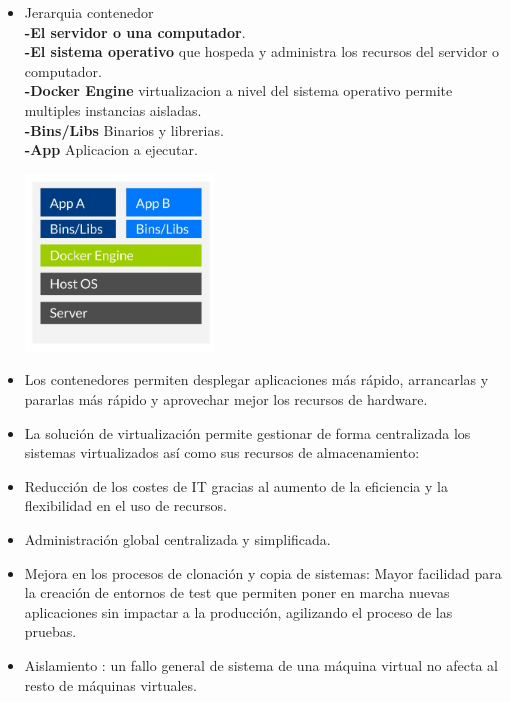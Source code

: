 \documentclass[twoside,twocolumn]{article}
\begin{document}
\begin{itemize}
	\item Jerarquia contenedor
	\\ \textbf{-El servidor o una computador}.
	\\ \textbf{-El sistema operativo} que hospeda y administra los recursos del servidor o computador.
	\\ \textbf{-Docker Engine} virtualizacion a nivel del sistema operativo permite multiples instancias aisladas.
	\\ \textbf{-Bins/Libs} Binarios y librerias.
	\\ \textbf{-App} Aplicacion a ejecutar.
	\begin{center}
	\includegraphics[width=5cm]{./Imagenes/jerarquia2} 
	\end{center}
\end{itemize} 

\begin{itemize}
	\item Los contenedores permiten desplegar aplicaciones más rápido, arrancarlas y pararlas más rápido y aprovechar mejor los recursos de hardware.
	\item La solución de virtualización permite gestionar de forma centralizada los sistemas virtualizados así como sus recursos de almacenamiento:
	\item Reducción de los costes de IT gracias al aumento de la eficiencia y la flexibilidad en el uso de recursos.
	\item Administración global centralizada y simplificada.
	\item Mejora en los procesos de clonación y copia de sistemas: Mayor facilidad para la creación de entornos de test que permiten poner en marcha nuevas aplicaciones sin impactar a la producción, agilizando el proceso de las pruebas.
	\item Aislamiento : un fallo general de sistema de una máquina virtual no afecta al resto de máquinas virtuales.



\end{itemize} 
\end{document}
